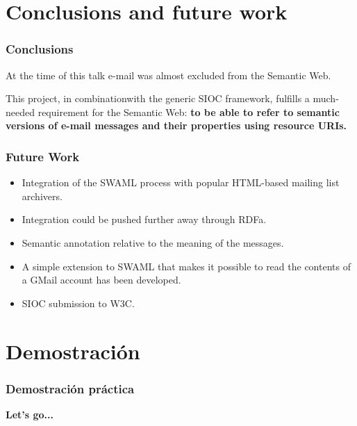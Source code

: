 \documentclass[spanish,notes=hide]{beamer}
\begin{document}
\section{Conclusions and future work}
\frame
{
  \frametitle{Conclusions}

  \begin{Large}
    At the time of this talk e-mail was almost excluded from the Semantic Web.

    \vspace{1cm}

    This project, in combinationwith the generic SIOC framework, fulfills a 
    much-needed requirement for the Semantic Web: \textbf{to be able to refer 
    to semantic versions of e-mail messages and their properties using resource 
    URIs.}
    
  \end{Large}
}
\frame
{
  \frametitle{Future Work}

  \begin{itemize}
   \item \begin{Large}Integration of the SWAML process with popular HTML-based mailing list archivers.\end{Large}
   \item \begin{Large}Integration could be pushed further away through RDFa.\end{Large}
   \item \begin{Large}Semantic annotation relative to the meaning of the messages.\end{Large}
   \item \begin{Large}A simple extension to SWAML that makes it possible to read the contents of a GMail account has 
		been developed.\end{Large}
   \item \begin{Large}SIOC submission to W3C.\end{Large}
  \end{itemize}
}

\section{Demostración}
\frame
{
  \frametitle{Demostración práctica}

  \begin{center}
    \LARGE{\textbf{Let's go...}}
  \end{center}
}
\end{document}
